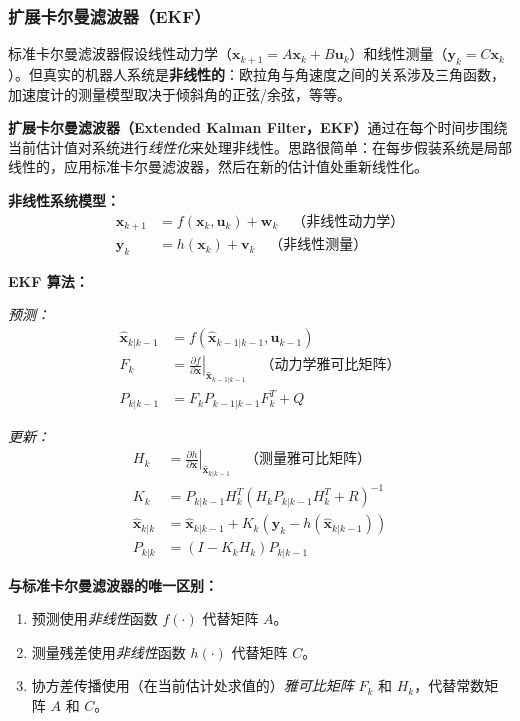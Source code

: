 \subsubsection{扩展卡尔曼滤波器（EKF）}

标准卡尔曼滤波器假设线性动力学（$\mathbf{x}_{k+1} = A\mathbf{x}_k + B\mathbf{u}_k$）和线性测量（$\mathbf{y}_k = C\mathbf{x}_k$）。但真实的机器人系统是\textbf{非线性的}：欧拉角与角速度之间的关系涉及三角函数，加速度计的测量模型取决于倾斜角的正弦/余弦，等等。

\textbf{扩展卡尔曼滤波器（Extended Kalman Filter，EKF）}通过在每个时间步围绕当前估计值对系统进行\textit{线性化}来处理非线性。思路很简单：在每步假装系统是局部线性的，应用标准卡尔曼滤波器，然后在新的估计值处重新线性化。

\textbf{非线性系统模型：}
\begin{align}
\mathbf{x}_{k+1} &= f(\mathbf{x}_k, \mathbf{u}_k) + \mathbf{w}_k \quad \text{（非线性动力学）} \\
\mathbf{y}_k &= h(\mathbf{x}_k) + \mathbf{v}_k \quad \text{（非线性测量）}
\end{align}

\textbf{EKF 算法：}

\textit{预测：}
\begin{align}
\hat{\mathbf{x}}_{k|k-1} &= f(\hat{\mathbf{x}}_{k-1|k-1}, \mathbf{u}_{k-1}) \\
F_k &= \left.\frac{\partial f}{\partial \mathbf{x}}\right|_{\hat{\mathbf{x}}_{k-1|k-1}} \quad \text{（动力学雅可比矩阵）} \\
P_{k|k-1} &= F_k P_{k-1|k-1} F_k^T + Q
\end{align}

\textit{更新：}
\begin{align}
H_k &= \left.\frac{\partial h}{\partial \mathbf{x}}\right|_{\hat{\mathbf{x}}_{k|k-1}} \quad \text{（测量雅可比矩阵）} \\
K_k &= P_{k|k-1} H_k^T (H_k P_{k|k-1} H_k^T + R)^{-1} \\
\hat{\mathbf{x}}_{k|k} &= \hat{\mathbf{x}}_{k|k-1} + K_k \left(\mathbf{y}_k - h(\hat{\mathbf{x}}_{k|k-1})\right) \\
P_{k|k} &= (I - K_k H_k) P_{k|k-1}
\end{align}

\textbf{与标准卡尔曼滤波器的唯一区别：}
\begin{enumerate}
    \item 预测使用\textit{非线性}函数 $f(\cdot)$ 代替矩阵 $A$。
    \item 测量残差使用\textit{非线性}函数 $h(\cdot)$ 代替矩阵 $C$。
    \item 协方差传播使用（在当前估计处求值的）\textit{雅可比矩阵} $F_k$ 和 $H_k$，代替常数矩阵 $A$ 和 $C$。
\end{enumerate}

